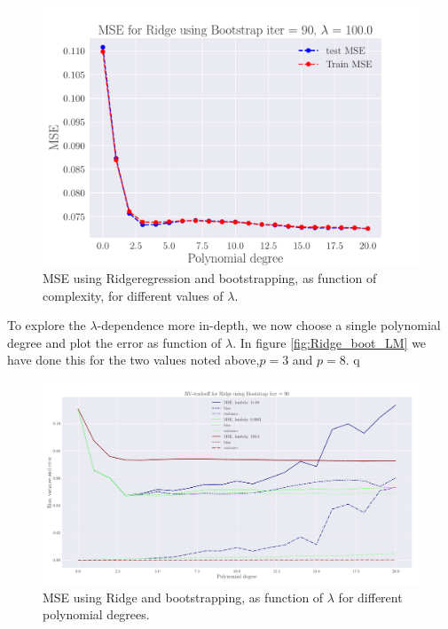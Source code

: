 \documentclass[reprint,english,notitlepage,aps,nobalancelastpage,nofootinbib]{revtex4-1}  %
\begin{document}
\begin{figure}[H]
	\endminipage\hfill
	\includegraphics[width=\linewidth]{MSE_Ridge_n30_eps02_pol20_Bootstrap_re90_lam_100_0.pdf}
	\endminipage
	\caption{MSE using Ridgeregression and bootstrapping, as function of complexity, for different values of $\lambda$.} \label{fig:Ridge_boot_PM}
\end{figure}

To explore the $\lambda$-dependence more in-depth, we now choose a single polynomial degree and  plot the error as function of $\lambda$.  In figure \ref{fig:Ridge_boot_LM} we have done this for the two values noted above,$p=3$ and $p=8$.
q

\begin{figure}[H]
	\includegraphics[width=\linewidth]{LBVT_Ridge_Bootstrap_n30_eps0_2_p20_lmbm8_2.pdf}
	\caption{MSE using Ridge and bootstrapping, as function of $\lambda$ for different polynomial degrees.}
	\label{fig:Ridge_boot_BVT}
\end{figure}
\end{document}
